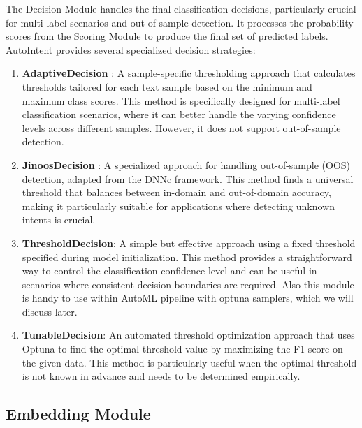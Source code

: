 The Decision Module handles the final classification decisions, particularly crucial for multi-label scenarios and out-of-sample detection. It processes the probability scores from the Scoring Module to produce the final set of predicted labels. AutoIntent provides several specialized decision strategies:

\begin{enumerate}
    \item \textbf{AdaptiveDecision} \cite{hou2020fewshotlearningmultilabelintent}: A sample-specific thresholding approach that calculates thresholds tailored for each text sample based on the minimum and maximum class scores. This method is specifically designed for multi-label classification scenarios, where it can better handle the varying confidence levels across different samples. However, it does not support out-of-sample detection.
    
    \item \textbf{JinoosDecision} \cite{zhang2020discriminativenearestneighborfewshot}: A specialized approach for handling out-of-sample (OOS) detection, adapted from the DNNc framework. This method finds a universal threshold that balances between in-domain and out-of-domain accuracy, making it particularly suitable for applications where detecting unknown intents is crucial.
    
    \item \textbf{ThresholdDecision}: A simple but effective approach using a fixed threshold specified during model initialization. This method provides a straightforward way to control the classification confidence level and can be useful in scenarios where consistent decision boundaries are required. Also this module is handy to use within AutoML pipeline with optuna samplers, which we will discuss later.
    
    \item \textbf{TunableDecision}: An automated threshold optimization approach that uses Optuna \cite{akiba2019optuna} to find the optimal threshold value by maximizing the F1 score on the given data. This method is particularly useful when the optimal threshold is not known in advance and needs to be determined empirically.
\end{enumerate}

\subsection{Embedding Module}\label{sec:embedding}

